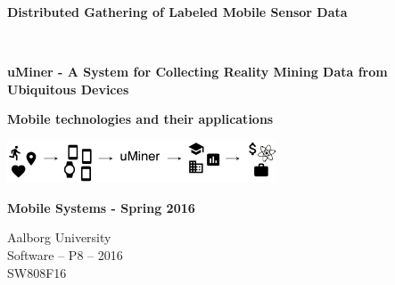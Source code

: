 
\begin{center}
	
	\vspace{8cm}

	\begin{spacing}{2.1}
		\begin{Huge}
			\textbf{Distributed Gathering of Labeled Mobile Sensor Data}
		\end{Huge}
		\\
		\vspace{0.6cm}
		\begin{huge}
			\textbf{uMiner - A System for Collecting Reality Mining Data from Ubiquitous Devices}
		\end{huge}
	\end{spacing}

	\vspace{0.6cm}

	\begin{Large}
		\textbf{Mobile technologies and their applications}
	\end{Large}

	\includegraphics[width=0.6\textwidth]{graphic/miscellaneous/front_page}

	\begin{large} 
		\textbf{Mobile Systems - Spring 2016}
	\end{large}

	\vspace*{\fill}

	Aalborg University		\\
	Software -- P8 -- 2016	\\
	SW808F16				\\

\end{center}



\thispagestyle{empty}